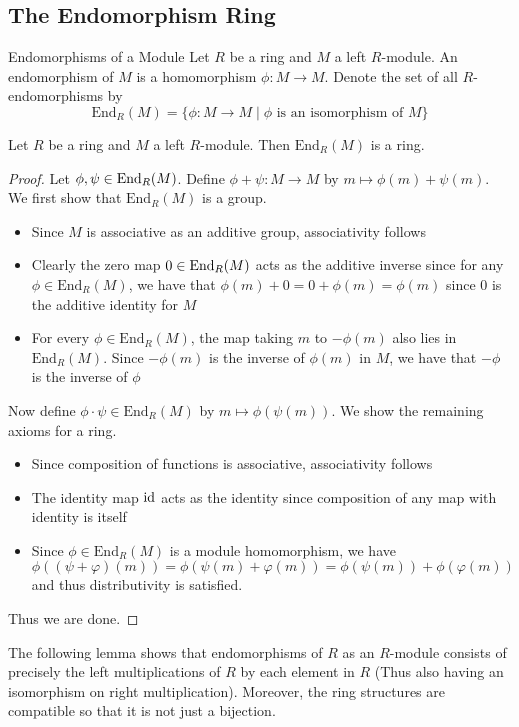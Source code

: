 \documentclass[a4paper]{article}
\begin{document}
\subsection{The Endomorphism Ring}
\begin{defn}{Endomorphisms of a Module}{} Let $R$ be a ring and $M$ a left $R$-module. An endomorphism of $M$ is a homomorphism $\phi:M\to M$. Denote the set of all $R$-endomorphisms by $$\text{End}_R(M)=\{\phi:M\to M\;|\;\phi\text{ is an isomorphism of }M\}$$
\end{defn}

\begin{prp}{}{} Let $R$ be a ring and $M$ a left $R$-module. Then $\text{End}_R(M)$ is a ring. \tcbline
\begin{proof}
Let $\phi,\psi\in\operatorname{End}_R(M)$. Define $\phi+\psi:M\to M$ by $m\mapsto\phi(m)+\psi(m)$. We first show that $\text{End}_R(M)$ is a group. 
\begin{itemize}
\item Since $M$ is associative as an additive group, associativity follows
\item Clearly the zero map $0\in\operatorname{End}_R(M)$ acts as the additive inverse since for any $\phi\in\text{End}_R(M)$, we have that $\phi(m)+0=0+\phi(m)=\phi(m)$ since $0$ is the additive identity for $M$
\item For every $\phi\in\text{End}_R(M)$, the map taking $m$ to $-\phi(m)$ also lies in $\text{End}_R(M)$. Since $-\phi(m)$ is the inverse of $\phi(m)$ in $M$, we have that $-\phi$ is the inverse of $\phi$
\end{itemize}
Now define $\phi\cdot\psi\in\text{End}_R(M)$ by $m\mapsto\phi(\psi(m))$. We show the remaining axioms for a ring. 
\begin{itemize}
\item Since composition of functions is associative, associativity follows
\item The identity map $\operatorname{id}$ acts as the identity since composition of any map with identity is itself
\item Since $\phi\in\text{End}_R(M)$ is a module homomorphism, we have $$\phi((\psi+\varphi)(m))=\phi(\psi(m)+\varphi(m))=\phi(\psi(m))+\phi(\varphi(m))$$ and thus distributivity is satisfied. 
\end{itemize}
Thus we are done. 
\end{proof}
\end{prp}

The following lemma shows that endomorphisms of $R$ as an $R$-module consists of precisely the left multiplications of $R$ by each element in $R$ (Thus also having an isomorphism on right multiplication). Moreover, the ring structures are compatible so that it is not just a bijection. 
\end{document}
